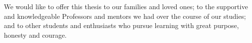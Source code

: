 
\begin{dedicatoria}%

We would like to offer this thesis to our families and loved ones;
to the supportive and knowledgeable Professors and mentors we had
over the course of our studies; and to other students and enthusiasts
who pursue learning with great purpose, honesty and courage.

\end{dedicatoria}
